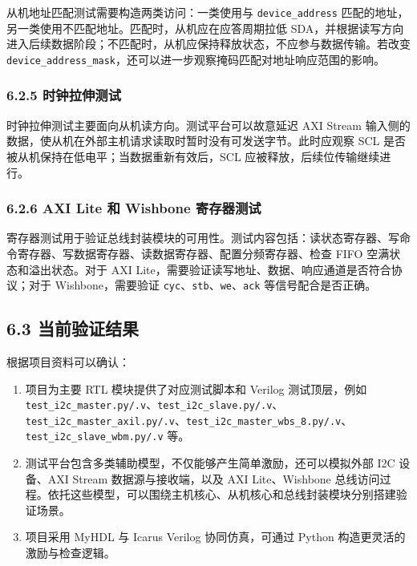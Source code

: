 从机地址匹配测试需要构造两类访问：一类使用与 \texttt{device\_address}
匹配的地址，另一类使用不匹配地址。匹配时，从机应在应答周期拉低
SDA，并根据读写方向进入后续数据阶段；不匹配时，从机应保持释放状态，不应参与数据传输。若改变
\texttt{device\_address\_mask}，还可以进一步观察掩码匹配对地址响应范围的影响。

\subsubsection{6.2.5
时钟拉伸测试}\label{ux65f6ux949fux62c9ux4f38ux6d4bux8bd5}

时钟拉伸测试主要面向从机读方向。测试平台可以故意延迟 AXI Stream
输入侧的数据，使从机在外部主机请求读取时暂时没有可发送字节。此时应观察
SCL 是否被从机保持在低电平；当数据重新有效后，SCL
应被释放，后续位传输继续进行。

\subsubsection{6.2.6 AXI Lite 和 Wishbone
寄存器测试}\label{axi-lite-ux548c-wishbone-ux5bc4ux5b58ux5668ux6d4bux8bd5}

寄存器测试用于验证总线封装模块的可用性。测试内容包括：读状态寄存器、写命令寄存器、写数据寄存器、读数据寄存器、配置分频寄存器、检查
FIFO 空满状态和溢出状态。对于 AXI
Lite，需要验证读写地址、数据、响应通道是否符合协议；对于
Wishbone，需要验证 \texttt{cyc}、\texttt{stb}、\texttt{we}、\texttt{ack}
等信号配合是否正确。

\subsection{6.3
当前验证结果}\label{ux5f53ux524dux9a8cux8bc1ux7ed3ux679c}

根据项目资料可以确认：

\begin{enumerate}
\def\labelenumi{\arabic{enumi}.}
\tightlist
\item
  项目为主要 RTL 模块提供了对应测试脚本和 Verilog 测试顶层，例如
  \texttt{test\_i2c\_master.py/.v}、\texttt{test\_i2c\_slave.py/.v}、\texttt{test\_i2c\_master\_axil.py/.v}、\texttt{test\_i2c\_master\_wbs\_8.py/.v}、\texttt{test\_i2c\_slave\_wbm.py/.v}
  等。
\item
  测试平台包含多类辅助模型，不仅能够产生简单激励，还可以模拟外部 I2C
  设备、AXI Stream 数据源与接收端，以及 AXI Lite、Wishbone
  总线访问过程。依托这些模型，可以围绕主机核心、从机核心和总线封装模块分别搭建验证场景。
\item
  项目采用 MyHDL 与 Icarus Verilog 协同仿真，可通过 Python
  构造更灵活的激励与检查逻辑。
\end{enumerate}

